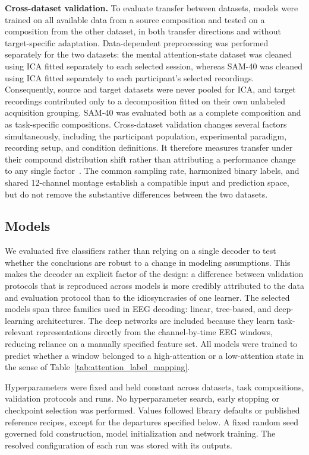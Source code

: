 \documentclass[10pt,letterpaper]{article}
\newcommand{\rev}[1]{#1}
\newcommand{\revs}[1]{#1}
\begin{document}
\textbf{Cross-dataset validation.}
\rev{To evaluate transfer between datasets, models were trained on all available data from a source composition and tested on a composition from the other dataset, in both transfer directions and without target-specific adaptation. Data-dependent preprocessing was performed separately for the two datasets: the mental attention-state dataset was cleaned using ICA fitted separately to each selected session, whereas SAM-40 was cleaned using ICA fitted separately to each participant's selected recordings. Consequently, source and target datasets were never pooled for ICA, and target recordings contributed only to a decomposition fitted on their own unlabeled acquisition grouping. SAM-40 was evaluated both as a complete composition and as task-specific compositions. Cross-dataset validation changes several factors simultaneously, including the participant population, experimental paradigm, recording setup, and condition definitions. It therefore measures transfer under their compound distribution shift rather than attributing a performance change to any single factor~\cite{lan2019domain}. The common sampling rate, harmonized binary labels, and shared 12-channel montage establish a compatible input and prediction space, but do not remove the substantive differences between the two datasets.}

\subsection*{\revs{Models}}

\rev{We evaluated five classifiers rather than relying on a single decoder to
test whether the conclusions are robust to a change in modeling assumptions.
This makes the decoder an explicit factor of the design: a difference between
validation protocols that is reproduced across models is more credibly
attributed to the data and evaluation protocol than to the idiosyncrasies of
one learner. The selected models span three families used in EEG decoding:
linear, tree-based, and deep-learning architectures. The deep networks are
included because they learn task-relevant representations directly from the
channel-by-time EEG windows, reducing reliance on a manually specified feature
set. All models were trained to predict whether a window belonged to a
high-attention or a low-attention state in the sense of
Table~\ref{tab:attention_label_mapping}.}

\rev{Hyperparameters were fixed and held constant across
datasets, task compositions, validation protocols and runs. No hyperparameter
search, early stopping or checkpoint selection was performed. Values followed library defaults or published reference
recipes, except for the departures specified below. A fixed random seed
governed fold construction, model initialization and network training. The
resolved configuration of each run was stored with its outputs.}
\end{document}
